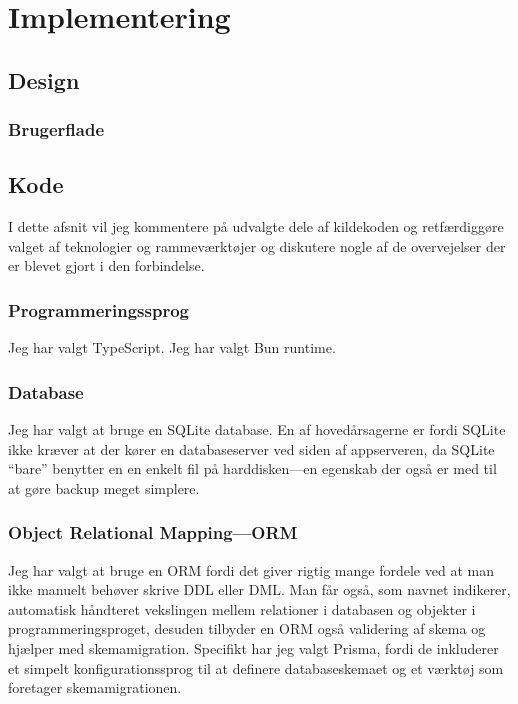 \documentclass[../main]{subfiles}
\begin{document}
\chapter{Implementering}

\section{Design}
\subsection{Brugerflade}



\section{Kode}
    I dette afsnit vil jeg kommentere på udvalgte dele af kildekoden og retfærdiggøre valget af teknologier og rammeværktøjer og diskutere nogle af de overvejelser der er blevet gjort i den forbindelse.

    \subsection{Programmeringssprog}
        Jeg har valgt TypeScript.
        Jeg har valgt Bun runtime.

    \subsection{Database}
        Jeg har valgt at bruge en SQLite database.
        \enskip
        En af hovedårsagerne er fordi SQLite ikke kræver at der kører en databaseserver ved siden af appserveren, da SQLite \enquote{bare} benytter en en enkelt fil på harddisken—en egenskab der også er med til at gøre backup meget simplere.
    

    \subsection{Object Relational Mapping—ORM}
        Jeg har valgt at bruge en ORM fordi det giver rigtig mange fordele ved at man ikke manuelt behøver skrive DDL eller DML.
        \enskip
        Man får også, som navnet indikerer, automatisk håndteret vekslingen mellem relationer i databasen og objekter i programmeringsproget, desuden tilbyder en ORM også validering af skema og hjælper med skemamigration. 
        \enskip
        Specifikt har jeg valgt Prisma, fordi de inkluderer et simpelt konfigurationssprog til at definere databaseskemaet og et værktøj som foretager skemamigrationen.
\end{document}
